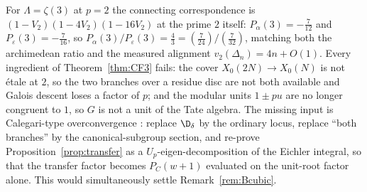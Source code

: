 \begin{remark}\label{rem:pdivd}
For $\Lambda=\zeta(3)$ at $p=2$ the connecting correspondence is
$(1-V_2)(1-4V_2)(1-16V_2)$ at the prime $2$ itself:
$P_\alpha(3)=-\tfrac7{12}$ and $P_\varepsilon(3)=-\tfrac7{16}$, so
$P_\alpha(3)/P_\varepsilon(3)=\tfrac43=(\tfrac7{24})/(\tfrac7{32})$, matching both
the archimedean ratio and the measured alignment $v_2(\Delta_n)=4n+O(1)$.  Every
ingredient of Theorem~\ref{thm:CF3} fails: the cover $X_0(2N)\to X_0(N)$ is not
\'etale at $2$, so the two branches over a residue disc are not both available and
Galois descent loses a factor of $p$; and the modular units $1\pm pu$ are no longer
congruent to $1$, so $G$ is not a unit of the Tate algebra.  The missing input is
Calegari-type overconvergence \cite{Cal05}: replace $\D_\delta$ by the ordinary
locus, replace ``both branches'' by the canonical-subgroup section, and re-prove
Proposition~\ref{prop:transfer} as a $U_p$-eigen-decomposition of the Eichler
integral, so that the transfer factor becomes $P_C(w+1)$ evaluated on the unit-root
factor alone.  This would simultaneously settle Remark~\ref{rem:Bcubic}.
\end{remark}
